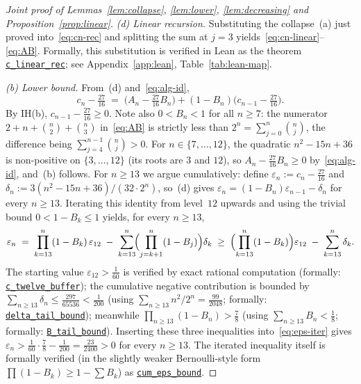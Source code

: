 \documentclass[reqno,final,11pt]{amsart}
\theoremstyle{plain}
\theoremstyle{definition}
\theoremstyle{remark}
\begin{document}
\begin{proof}[Joint proof of Lemmas~\ref{lem:collapse},
  \ref{lem:lower}, \ref{lem:decreasing} and Proposition~\ref{prop:linear}]
  \emph{(d) Linear recursion.}  Substituting the collapse~(a)
  just proved into~\eqref{eq:cn-rec} and splitting the sum at $j=3$
  yields~\eqref{eq:cn-linear}--\eqref{eq:AB}.  Formally, this
  substitution is verified in Lean as the theorem
  \href{https://github.com/pfaffelh/coins/blob/c60bcd3/CoinsLean/CoinsLean/Perturbation.lean\#L1495}{\texttt{c\_linear\_rec}};
  see Appendix~\ref{app:lean}, Table~\ref{tab:lean-map}.

  \emph{(b) Lower bound.}  From~(d) and~\eqref{eq:alg-id},
  \[
    c_n - \tfrac{27}{16}
    \;=\; \bigl(A_n-\tfrac{27}{16}B_n\bigr)
        + (1-B_n)\bigl(c_{n-1}-\tfrac{27}{16}\bigr).
  \]
  By IH(b), $c_{n-1}-\tfrac{27}{16}\ge 0$.  Note also
  $0<B_n<1$ for all $n\ge 7$: the numerator
  $2+n+\binom{n}{2}+\binom{n}{3}$ in~\eqref{eq:AB} is strictly
  less than $2^n=\sum_{j=0}^n\binom{n}{j}$, the difference being
  $\sum_{j=4}^{n-1}\binom{n}{j}>0$.  For $n\in\{7,\dots,12\}$, the
  quadratic $n^2-15n+36$ is non-positive on $\{3,\dots,12\}$
  (its roots are $3$ and $12$), so $A_n-\tfrac{27}{16}B_n\ge 0$
  by~\eqref{eq:alg-id}, and~(b) follows.  For $n\ge 13$ we argue
  cumulatively: define $\varepsilon_n:=c_n-\tfrac{27}{16}$ and
  $\delta_n:=3(n^2-15n+36)/(32\cdot 2^n)$,
  so~(d) gives $\varepsilon_n=(1-B_n)\varepsilon_{n-1}-\delta_n$
  for every $n\ge 13$.  Iterating this identity from level~$12$
  upwards and using the trivial bound $0<1-B_k\le 1$ yields, for
  every $n\ge 13$,
  \begin{equation}\label{eq:eps-iter}
    \varepsilon_n
    \;=\; \prod_{k=13}^{n}(1-B_k)\,\varepsilon_{12}
    \;-\; \sum_{k=13}^{n}\!\Bigl(\prod_{j=k+1}^{n}(1-B_j)\Bigr)\delta_k
    \;\ge\; \Bigl(\prod_{k=13}^{n}(1-B_k)\Bigr)\varepsilon_{12}
            \;-\; \sum_{k=13}^{n}\delta_k.
  \end{equation}
  The starting value $\varepsilon_{12}>\tfrac{1}{60}$ is verified by
  exact rational computation (formally:
  \href{https://github.com/pfaffelh/coins/blob/c60bcd3/CoinsLean/CoinsLean/Perturbation.lean\#L2995}{\texttt{c\_twelve\_buffer}});
  the cumulative negative contribution is bounded by
  $\sum_{n\ge 13}\delta_n \le\tfrac{297}{65536}<\tfrac{1}{200}$
  (using $\sum_{n\ge 13}n^2/2^n=\tfrac{99}{2048}$; formally:
  \href{https://github.com/pfaffelh/coins/blob/c60bcd3/CoinsLean/CoinsLean/Perturbation.lean\#L889}{\texttt{delta\_tail\_bound}});
  meanwhile $\prod_{n\ge 13}(1-B_n)>\tfrac{7}{8}$ (using
  $\sum_{n\ge 13}B_n<\tfrac{1}{8}$; formally:
  \href{https://github.com/pfaffelh/coins/blob/c60bcd3/CoinsLean/CoinsLean/Perturbation.lean\#L864}{\texttt{B\_tail\_bound}}).
  Inserting these three inequalities into~\eqref{eq:eps-iter} gives
  $\varepsilon_n>\tfrac{1}{60}\cdot\tfrac{7}{8}-\tfrac{1}{200}
  =\tfrac{23}{2400}>0$ for every $n\ge 13$.  The iterated inequality
  itself is formally verified (in the slightly weaker
  Bernoulli-style form
  $\prod(1-B_k)\ge 1-\sum B_k$) as
  \href{https://github.com/pfaffelh/coins/blob/c60bcd3/CoinsLean/CoinsLean/Perturbation.lean\#L949}{\texttt{cum\_eps\_bound}}.


\end{proof}
\end{document}
